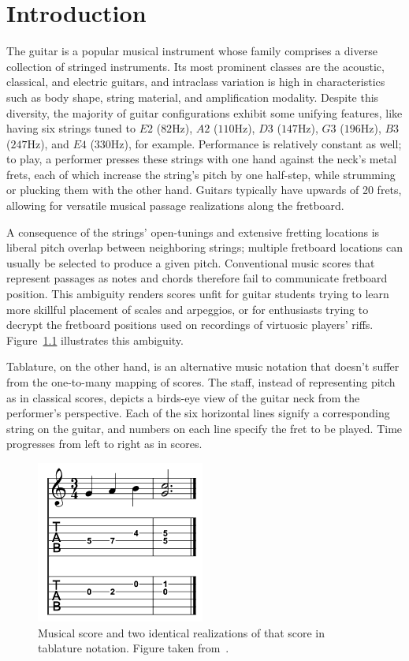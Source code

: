 \documentclass[12pt]{cmuthesis}
\begin{document}
\chapter{Introduction} 
The guitar is a popular musical instrument whose family comprises a diverse collection of stringed instruments. Its most prominent classes are the acoustic, classical, and electric guitars, and intraclass variation is high in characteristics such as body shape, string material, and amplification modality. Despite this diversity, the majority of guitar configurations exhibit some unifying features, like having six strings tuned to $E2$ ($82$Hz), $A2$ ($110$Hz), $D3$ ($147$Hz), $G3$ ($196$Hz), $B3$ ($247$Hz), and $E4$ ($330$Hz), for example. Performance is relatively constant as well; to play, a performer presses these strings with one hand against the neck's metal frets, each of which increase the string's pitch by one half-step, while strumming or plucking them with the other hand. Guitars typically have upwards of 20 frets, allowing for versatile musical passage realizations along the fretboard.

A consequence of the strings' open-tunings and extensive fretting locations is liberal pitch overlap between neighboring strings; multiple fretboard locations can usually be selected to produce a given pitch. Conventional music scores that represent passages as notes and chords therefore fail to communicate fretboard position. This ambiguity renders scores unfit for guitar students trying to learn more skillful placement of scales and arpeggios, or for enthusiasts trying to decrypt the fretboard positions used on recordings of virtuosic players' riffs. Figure~\ref{fig:score-tabs} illustrates this ambiguity.

Tablature, on the other hand, is an alternative music notation that doesn't suffer from the one-to-many mapping of scores. The staff, instead of representing pitch as in classical scores, depicts a birds-eye view of the guitar neck from the performer's perspective. Each of the six horizontal lines signify a corresponding string on the guitar, and numbers on each line specify the fret to be played. Time progresses from left to right as in scores. 

\begin{figure}[h] 
\centering
\includegraphics[scale=0.8]{score-tabs}
\caption{Musical score and two identical realizations of that score in tablature notation. Figure taken from~\cite{barbanchoi2012}.}
\label{fig:score-tabs}
\end{figure}
\end{document}
